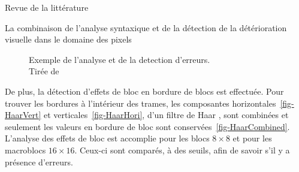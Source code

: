 \documentclass[letterpaper, twoside, 12pt,memoire]{thETS}
\begin{document}
\begin{chapter}{Revue de la littérature}
\begin{section}{La combinaison de l'analyse syntaxique et de la détection de la
détérioration visuelle dans le domaine des pixels}
\begin{figure}
\caption{Exemple de l'analyse et de la detection d'erreurs.
\\Tirée de \citet[p.~25]{Ikuno2007}}
\label{fig-FrameDiff}
\end{figure}

De plus, la détection d'effets de bloc en bordure de blocs est effectuée. Pour
trouver les bordures à l'intérieur des trames, les composantes
horizontales~\ref{fig-HaarVert} et verticales~\ref{fig-HaarHori}, d'un filtre de
Haar \citep{Haar1911}, sont combinées et seulement les valeurs en bordure de
bloc sont conservées~\ref{fig-HaarCombined}. L'analyse des effets de bloc est
accomplie pour les blocs $8 \times 8$ et pour les macroblocs $16 \times 16$.
Ceux-ci sont comparés, à des seuils, afin de savoir s'il y a présence d'erreurs.


\end{section}
\end{chapter}
\end{document}
